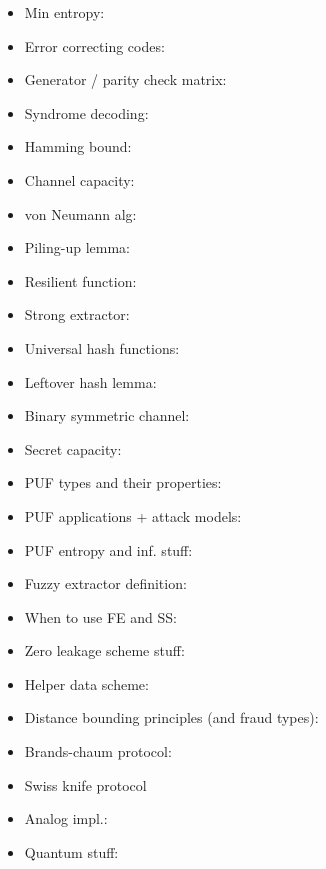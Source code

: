 \documentclass[twocolumn,9pt]{extarticle}
\begin{document}
\begin{itemize}
	\item Min entropy:

	\item Error correcting codes:

	\item Generator / parity check matrix:

	\item Syndrome decoding:

	\item Hamming bound:

	\item Channel capacity:

	\item von Neumann alg:

	\item Piling-up lemma:

	\item Resilient function:

	\item Strong extractor:

	\item Universal hash functions:

	\item Leftover hash lemma:

	\item Binary symmetric channel:

	\item Secret capacity:

	\item PUF types and their properties:

	\item PUF applications + attack models:

	\item PUF entropy and inf. stuff:

	\item Fuzzy extractor definition:

	\item When to use FE and SS:

	\item Zero leakage scheme stuff:

	\item Helper data scheme:

	\item Distance bounding principles (and fraud types):

	\item Brands-chaum protocol:

	\item Swiss knife protocol

	\item Analog impl.:

	\item Quantum stuff:


\end{itemize}
\end{document}
